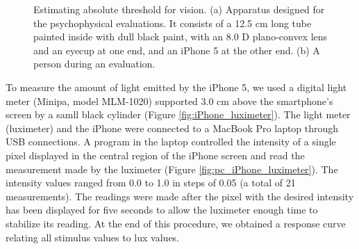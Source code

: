 \begin{figure}[!t]
	\centering
	
	\caption[Estimating absolute threshold for vision]{Estimating absolute threshold for vision. (a) Apparatus designed for the psychophysical evaluations. It consists of a 12.5 cm long tube painted inside with dull black paint, with an 8.0 D plano-convex lens and an eyecup at one end, and an iPhone 5 at the other end. (b) A person during an evaluation.}
	\label{fig:3d_apparatus}
\end{figure}


To measure the amount of light emitted by the iPhone 5, we  used a digital light meter (Minipa, model MLM-1020) supported 3.0 cm above the smartphone's screen by a samll black cylinder (Figure \ref{fig:iPhone_luximeter}). The light meter (luximeter) and the iPhone were connected to a MacBook Pro laptop through USB connections. A program in the laptop controlled the intensity of a single pixel displayed in the central region of the iPhone screen and read the measurement made by the luximeter (Figure \ref{fig:pc_iPhone_luximeter}). The intensity values ranged from 0.0 to 1.0 in steps of 0.05 (a total of 21 measurements). The readings were made after the pixel with the desired intensity has been displayed for five seconds to allow the luximeter enough time to stabilize its reading. At the end of this procedure, we obtained a response curve relating all stimulus values to lux values. 

